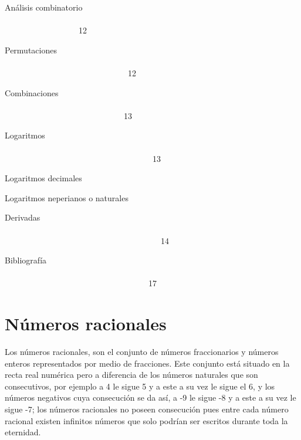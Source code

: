 \documentclass{article}
\begin{document}
An\'alisis combinatorio \ \ \ \ \ \ \ \ \ \ \ \ \ \ \ \ \ \ \ \ \ \ \ \ \ \ \ \ \ \ \ \ \ \ \ \ \ \ \ \ \ \ \ \ \ \ \ \ \ \ \ \ \ \ \ \ \ \ \ \ \ \ \ \ \ \ \ \ \ \ \ \ \ \ \ \ \ \ \ \ \ \ \ \ \ \ \ \ \ \ 12

Permutaciones \ \ \ \ \ \ \ \ \ \ \ \ \ \ \ \ \ \ \ \ \ \ \ \ \ \ \ \ \ \ \ \ \ \ \ \ \ \ \ \ \ \ \ \ \ \ \ \ \ \ \ \ \ \ \ \ \ \ \ \ \ \ \ \ \ \ \ \ \ \ \ \ \ \ \ \ \ \ \ \ \ \ \ \ \ \ \ \ \ \ \ \ \ \ \ \ \ \ \ \ \ \ 12

Combinaciones \ \ \ \ \ \ \ \ \ \ \ \ \ \ \ \ \ \ \ \ \ \ \ \ \ \ \ \ \ \ \ \ \ \ \ \ \ \ \ \ \ \ \ \ \ \ \ \ \ \ \ \ \ \ \ \ \ \ \ \ \ \ \ \ \ \ \ \ \ \ \ \ \ \ \ \ \ \ \ \ \ \ \ \ \ \ \ \ \ \ \ \ \ \ \ \ \ \ \ \ \ 13



Logaritmos \ \ \ \ \ \ \ \ \ \ \ \ \ \ \ \ \ \ \ \ \ \ \ \ \ \ \ \ \ \ \ \ \ \ \ \ \ \ \ \ \ \ \ \ \ \ \ \ \ \ \ \ \ \ \ \ \ \ \ \ \ \ \ \ \ \ \ \ \ \ \ \ \ \ \ \ \ \ \ \ \ \ \ \ \ \ \ \ \ \ \ \ \ \ \ \ \ \ \ \ \ \ \ \ \ \ \ \ 13

Logaritmos decimales

Logaritmos neperianos o naturales

Derivadas \ \ \ \ \ \ \ \ \ \ \ \ \ \ \ \ \ \ \ \ \ \ \ \ \ \ \ \ \ \ \ \ \ \ \ \ \ \ \ \ \ \ \ \ \ \ \ \ \ \ \ \ \ \ \ \ \ \ \ \ \ \ \ \ \ \ \ \ \ \ \ \ \ \ \ \ \ \ \ \ \ \ \ \ \ \ \ \ \ \ \ \ \ \ \ \ \ \ \ \ \ \ \ \ \ \ \ \ \ \ 14

Bibliograf\'ia \ \ \ \ \ \ \ \ \ \ \ \ \ \ \ \ \ \ \ \ \ \ \ \ \ \ \ \ \ \ \ \ \ \ \ \ \ \ \ \ \ \ \ \ \ \ \ \ \ \ \ \ \ \ \ \ \ \ \ \ \ \ \ \ \ \ \ \ \ \ \ \ \ \ \ \ \ \ \ \ \ \ \ \ \ \ \ \ \ \ \ \ \ \ \ \ \ \ \ \ \ \ \ \ \ \ \ 17

\bigskip
\bigskip

\clearpage\section[N\'umeros racionales]{N\'umeros racionales}

\bigskip

Los n\'umeros racionales, son el conjunto de n\'umeros fraccionarios y n\'umeros enteros representados por medio de fracciones. Este conjunto est\'a situado en la recta real num\'erica pero a diferencia de los n\'umeros naturales que son consecutivos, por ejemplo a 4 le sigue 5 y a este a su vez le sigue el 6, y los n\'umeros negativos cuya consecuci\'on se da as\'i, a -9 le sigue -8 y a este a su vez le sigue -7; los n\'umeros racionales no poseen consecuci\'on pues entre cada n\'umero racional existen infinitos n\'umeros que solo podr\'ian ser escritos durante toda la eternidad.
\end{document}
